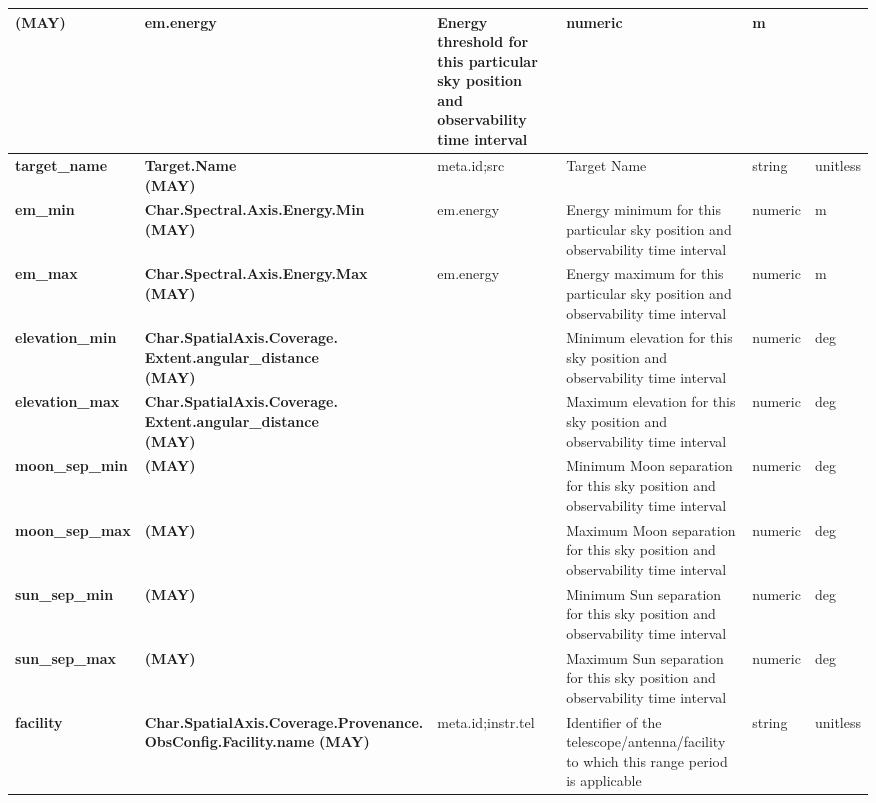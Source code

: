 \documentclass[11pt,a4paper]{ivoatex/ivoa}
\begin{document}
\begin{appendices}
\begin{table}[h]
\begin{adjustbox}{angle=90}
\begin{tabular}{|p{25mm}|p{50mm}|p{20mm}|p{40mm}|p{15mm}|p{10mm}|}
{(MAY)} & em.energy & Energy
threshold for this particular sky position and observability time interval
& numeric & m \\
\hline
\pagebreak
\textbf{target\_name} & \textbf{Target.Name  \newline
(MAY)} & meta.id;src &
Target Name & string & unitless \\
\hline
\textbf{em\_min} & \textbf{Char.Spectral.Axis.Energy.Min \newline
(MAY)} &
em.energy & Energy minimum for this particular sky position and
observability time interval & numeric & m \\
\hline
\textbf{em\_max} & \textbf{Char.Spectral.Axis.Energy.Max \newline
(MAY)} &
em.energy & Energy maximum for this particular sky position and
observability time interval & numeric & m \\
\hline
\textbf{elevation\_min} & \textbf{
Char.SpatialAxis.Coverage. \newline
Extent.angular\_distance \newline
(MAY)} & 
& Minimum elevation for this sky position and observability time interval &
numeric & deg \\
\hline
\textbf{elevation\_max} & \textbf{
Char.SpatialAxis.Coverage. \newline
Extent.angular\_distance \newline
(MAY)} & 
& Maximum elevation for this sky position and observability time interval &
numeric & deg \\
\hline
\textbf{moon\_sep\_min} & \textbf{(MAY)} &  & Minimum
Moon separation for this sky position and observability time interval &
numeric & deg \\
\hline
\textbf{moon\_sep\_max} & \textbf{(MAY)} &  & Maximum
Moon separation for this sky position and observability time interval &
numeric & deg \\
\hline
\textbf{sun\_sep\_min} & \textbf{(MAY)} &  & Minimum Sun
separation for this sky position and observability time interval & numeric &
deg \\
\hline
\textbf{sun\_sep\_max} & \textbf{(MAY)} &  & Maximum Sun
separation for this sky position and observability time interval & numeric &
deg \\
\hline
\textbf{facility} & \textbf{Char.SpatialAxis.Coverage.Provenance.\newline ObsConfig.Facility.name} 
\newline
\textbf{(MAY)} & meta.id;instr.tel & Identifier of the 
telescope/antenna/facility to which this range period is applicable 
& string & unitless\\
\hline
\end{tabular}
\end{adjustbox}
\end{table}
\FloatBarrier


\end{appendices}
\end{document}
